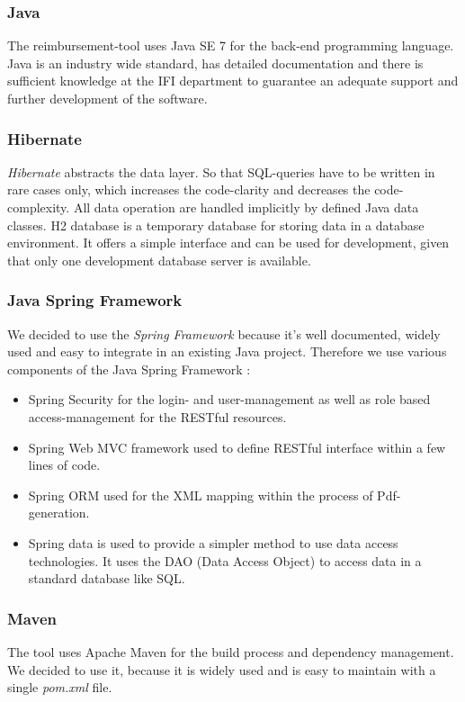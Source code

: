 \subsubsection{Java}
The reimbursement-tool uses Java SE 7 for the back-end programming language. Java is an industry wide standard, has detailed documentation and there is sufficient knowledge at the IFI department to guarantee an adequate support and further development of the software.

\subsubsection{Hibernate}
\textit{Hibernate} abstracts the data layer. So that SQL-queries have to be written in rare cases only, which increases the code-clarity and decreases the code-complexity. All data operation are handled implicitly by defined Java data classes.\newline
H2 database is a temporary database for storing data in a database environment. It offers a simple interface and can be used for development, given that only one development database server is available. \cite{hibernate}

\subsubsection{Java Spring Framework}
We decided to use the \textit{Spring Framework} because it's well documented, widely used and easy to integrate in an existing Java project. Therefore we use various components of the Java Spring Framework \cite{spring}:
\begin{itemize}
    \item Spring Security for the login- and user-management as well as role based access-management for the RESTful resources.
    \item Spring Web MVC framework used to define RESTful interface within a few lines of code.
    \item Spring ORM used for the XML mapping within the process of Pdf-generation.
    \item Spring data is used to provide a simpler method to use data access technologies. It uses the DAO (Data Access Object) \cite{dao} to access data in a standard database like SQL.
\end{itemize}

\subsubsection{Maven}
The tool uses Apache Maven \cite{maven} for the build process and dependency management. We decided to use it, because it is widely used and is easy to maintain with a single \textit{pom.xml} file. 

